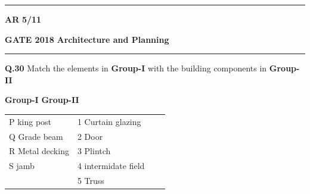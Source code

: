 \documentclass[journal,12pt,onecolumn]{IEEEtran}
\theoremstyle{remark}
\begin{document}
 \noindent
\hrule \vspace{0.0875CM} \textbf{AR} \hfill  \textbf{5/11}
 
\newpage

\noindent
\textbf{GATE 2018} \hfill \textbf{Architecture and Planning}
\vspace{0.0012cm} \hrule
\vspace{0.5cm}

\textbf{Q.30}\hspace{0.5cm} Match the elements in \textbf{Group-I} with the building components in \textbf{Group-II}

\vspace{0.15cm}

\hspace{3cm}  \textbf{Group-I}\hspace{8cm} \textbf{Group-II} \\
\vspace{0.15cm}
\begin{tabular}{llcl}
\vspace{0.15cm}
\hspace{2cm} P  \hspace{0.3cm}king post &\hspace{6cm} 1 \hspace{0.3cm}Curtain glazing \\
\vspace{0.15cm}
\hspace{2cm} Q \hspace{0.3cm}Grade beam &\hspace{6cm} 2\hspace{0.3cm}\hspace{0.3cm}  Door              \\
\vspace{0.15cm}
\hspace{2cm} R  \hspace{0.3cm} Metal decking  &\hspace{6cm} 3 \hspace{0.3cm}Plintch                 \\
\vspace{0.15cm}
\hspace{2cm} S  \hspace{0.3cm}jamb   &\hspace{6cm} 4 \hspace{0.3cm} intermidate field       \\
                        &\hspace{6cm} 5\hspace{0.3cm}  Truss 
\end{tabular}
\vspace{0.15cm}
\end{document}
